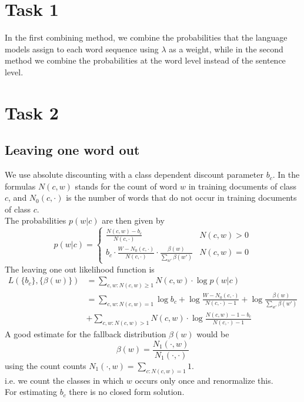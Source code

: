 \documentclass[%
   11pt,              %
   ngerman,           %
   a4paper,           %
   DIV11,             %
]{scrartcl}%
\begin{document}
\section*{Task 1}

In the first combining method, we combine the probabilities that the language models assign to each word sequence using $\lambda$ as a weight, while in the second method we combine the probabilities at the word level instead of the sentence level.

\section*{Task 2}
\subsection*{Leaving one word out}
We use absolute discounting with a class dependent discount parameter $b_c$. In the formulas $N(c,w)$ stands for the count of word $w$ in training documents of class $c$, and $N_0(c, \cdot)$ is the number of words that do not occur in training documents of class $c.$\\
The probabilities $p(w|c)$ are then given by
\begin{equation*}
	p(w|c) = 
	\begin{cases}
		\frac{N(c,w) - b_c}{N(c, \cdot)} & N(c,w) > 0 \\
		b_c \cdot \frac{W - N_0(c, \cdot)}{N(c, \cdot)} \cdot \frac{\beta(w)}{\sum_{w'}\beta(w')} & N(c,w) = 0
	\end{cases}
\end{equation*}
The leaving one out likelihood function is
\begin{align*}
	L(\{b_c\},\{\beta(w)\}) &= \sum_{c,w: N(c,w) \geq 1}N(c,w) \cdot \log p(w|c) \\
	&= \sum_{c,w: N(c,w) = 1}\log b_c + \log \frac{W - N_0(c, \cdot)}{N(c,\cdot) - 1} + \log \frac{\beta(w)}{\sum_{w'}\beta(w')} \\
	&+ \sum_{c,w: N(c,w) > 1}N(c,w) \cdot \log \frac{N(c,w) - 1 - b_c}{N(c,\cdot) - 1}
\end{align*}
A good estimate for the fallback distribution $\beta(w)$ would be
\begin{equation*}
	\beta(w) = \frac{N_1(\cdot, w)}{N_1(\cdot, \cdot)}
\end{equation*}
using the count counts $N_1(\cdot, w) = \sum_{c: N(c,w) = 1} 1$.\\
i.e. we count the classes in which $w$ occurs only once and renormalize this. \\
For estimating $b_c$ there is no closed form solution.
\end{document}
